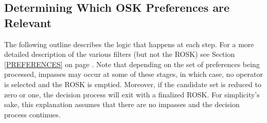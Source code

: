 \subsection{Determining Which OSK Preferences are Relevant}
\label{CHUNKING-subtleties-osk}

The following outline describes the logic that happens at each step. For a more detailed description of the various filters (but not the ROSK) see Section \ref{PREFERENCES} on page \pageref{PREFERENCES}. Note that depending on the set of preferences being processed, impasses may occur at some of these stages, in which case, no operator is selected and the ROSK is emptied. Moreover, if the candidate set is reduced to zero or one, the decision process will exit with a finalized ROSK. For simplicity's sake, this explanation assumes that there are no impasses and the decision process continues.


